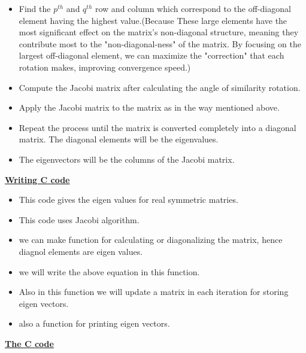 \documentclass[journal]{IEEEtran}
\begin{document}
\begin{itemize}
    \item Find the $p^{th}$ and $q^{th}$ row and column which correspond to the off-diagonal element having the highest value.(Because These large elements have the most significant effect on the matrix's non-diagonal structure, meaning they contribute most to the "non-diagonal-ness" of the matrix. By focusing on the largest off-diagonal element, we can maximize the "correction" that each rotation makes, improving convergence speed.)
    \item Compute the Jacobi matrix after calculating the angle of similarity rotation.
    \item Apply the Jacobi matrix to the matrix as in the way mentioned above.
    \item Repeat the process until the matrix is converted completely into a diagonal matrix. The diagonal elements will be the eigenvalues.
    \item The eigenvectors will be the columns of the Jacobi matrix.
\end{itemize}
\underline{\textbf{Writing C code }}\\
\begin{itemize}
    \item This code gives the eigen values for real symmetric matries.
    \item This code uses Jacobi algorithm.
    \item we can make function for calculating or diagonalizing the matrix, hence diagnol elements are eigen values.
    \item we will write the above equation in this function.
    \item Also in this function we will update a matrix in each iteration for storing eigen vectors.
    \item also a function for printing eigen vectors.
\end{itemize}
\underline{\textbf{The C code}}\\
\end{document}
